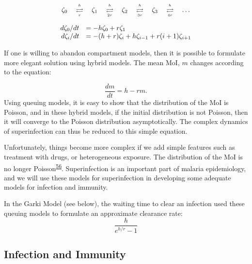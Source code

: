 \documentclass[
]{book}
\begin{document}
\begin{equation*}
\begin{array}{c}
%
\begin{array}{ccccccccc}
\zeta_0 &  {h\atop \longrightarrow} \atop {\longleftarrow \atop r} & \zeta_1  & {h\atop \longrightarrow} \atop {\longleftarrow \atop {2r}} & \zeta_2  & {h \atop \longrightarrow} \atop {\longleftarrow \atop {3r}} & \zeta_3  & {h \atop \longrightarrow} \atop {\longleftarrow \atop {4r}}& \ldots 
\end{array} 
\\ 
\\ 
\begin{array}{rl}
d\zeta_0/dt &= -h \zeta_0 + r \zeta_1 \\ 
d \zeta_i /dt &= -(h+r) \zeta_i + h \zeta_{i-1} + r(i+1) \zeta_{i+1} \\
\end{array} 
\end{array}
\end{equation*}

If one is willing to abandon compartment models, then it is possible to formulate more elegant solution using hybrid models. The mean MoI, \(m\) changes according to the equation:

\[\frac{dm}{dt} = h - r m.\]
Using queuing models, it is easy to show that the distribution of the MoI is Poisson, and in these hybrid models, if the initial distribution is not Poisson, then it will converge to the Poisson distribution asymptotically. The complex dynamics of superinfection can thus be reduced to this simple equation.

Unfortunately, things become more complex if we add simple features such as treatment with drugs, or heterogeneous exposure. The distribution of the MoI is no longer Poisson\textsuperscript{\protect\hyperlink{ref-HenryJM2020HybridModel}{56}}. Superinfection is an important part of malaria epidemiology, and we will use these models for superinfection in developing some adequate models for infection and immunity.

In the Garki Model (see below), the waiting time to clear an infection used these queuing models to formulate an approximate clearance rate: \[ \frac{h}{e^{h/r}-1}\]

\hypertarget{infection-and-immunity}{%
\subsection{Infection and Immunity}\label{infection-and-immunity}}
\end{document}
